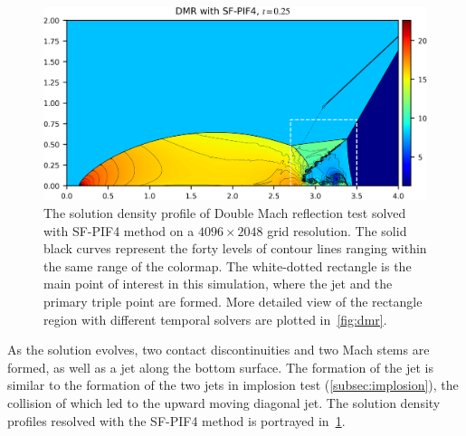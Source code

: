 \begin{figure}
    \centering
    \includegraphics[width=\textwidth]{fig/dmr_overview_sf4.png}
    \caption{The solution density profile of Double Mach reflection test
        solved with SF-PIF4 method on a \( 4096 \times 2048 \) grid resolution.
        The solid black curves represent the forty levels of contour lines
        ranging within the same range of the colormap.
        The white-dotted rectangle is the
        main point of interest in this simulation,
        where the jet and the primary triple point are formed.
        More detailed view of the rectangle region
        with different temporal solvers are plotted in~\cref{fig:dmr}.
    }\label{fig:dmr_overview}
\end{figure}

As the solution evolves, two contact discontinuities and two Mach stems are formed,
as well as a jet along the bottom surface. The formation of the jet is similar
to the formation of the two jets in implosion test (\cref{subsec:implosion}),
the collision of which led to the upward moving diagonal jet.
The solution density profiles resolved with the SF-PIF4 method
is portrayed in~\cref{fig:dmr_overview}.

